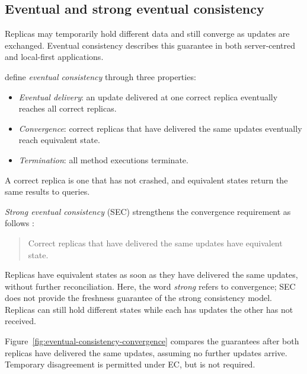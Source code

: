 \subsection{Eventual and strong eventual consistency}

Replicas may temporarily hold different data and still converge as updates are exchanged.
Eventual consistency describes this guarantee in both server-centred and local-first applications.

\textcite[Section~2.2, Definition~2]{conflict-free-replicated-data-types} define \emph{eventual consistency} through three properties:
\begin{itemize}
	\item \emph{Eventual delivery}: an update delivered at one correct replica eventually reaches all correct replicas.
	\item \emph{Convergence}: correct replicas that have delivered the same updates eventually reach equivalent state.
	\item \emph{Termination}: all method executions terminate.
\end{itemize}
A correct replica is one that has not crashed, and equivalent states return the same results to queries.

\pagebreak
\emph{Strong eventual consistency} (SEC) strengthens the convergence requirement as follows \parencite[Section~2.2, Definition~3]{conflict-free-replicated-data-types}:
\begin{quote}
	Correct replicas that have delivered the same updates have equivalent state.
\end{quote}

Replicas have equivalent states as soon as they have delivered the same updates, without further reconciliation.
Here, the word \emph{strong} refers to convergence; SEC does not provide the freshness guarantee of the strong consistency model.
Replicas can still hold different states while each has updates the other has not received.

Figure~\ref{fig:eventual-consistency-convergence} compares the guarantees after both replicas have delivered the same updates, assuming no further updates arrive.
Temporary disagreement is permitted under EC, but is not required.

\begin{illustration}[htbp]
	\centering
	\caption{Convergence after two correct replicas have delivered the same updates}
	\label{fig:eventual-consistency-convergence}
	\begingroup
	
	\endgroup
\end{illustration}
\FloatBarrier

